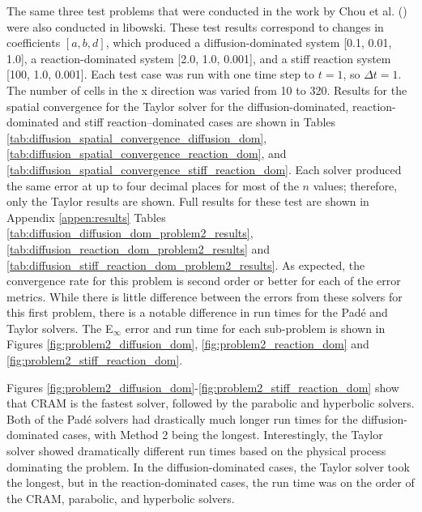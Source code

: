 The same three test problems that were conducted in the work by Chou et al. (\cite{ching2007}) were also conducted in libowski. These test results correspond to changes in coefficients $[a, b, d]$, which produced a diffusion-dominated system [0.1, 0.01, 1.0], a reaction-dominated system [2.0, 1.0, 0.001], and a stiff reaction system [100, 1.0, 0.001]. Each test case was run with one time step to $t = 1$, so $\Delta t = 1$. The number of cells in the x direction was varied from 10 to 320. Results for the spatial convergence for the Taylor solver for the diffusion-dominated, reaction-dominated and stiff reaction--dominated cases are shown in Tables \ref{tab:diffusion_spatial_convergence_diffusion_dom}, \ref{tab:diffusion_spatial_convergence_reaction_dom}, and \ref{tab:diffusion_spatial_convergence_stiff_reaction_dom}. Each solver produced the same error at up to four decimal places for most of the $n$ values; therefore, only the Taylor results are shown. Full results for these test are shown in Appendix \ref{appen:results} Tables \ref{tab:diffusion_diffusion_dom_problem2_results}, \ref{tab:diffusion_reaction_dom_problem2_results} and \ref{tab:diffusion_stiff_reaction_dom_problem2_results}. As expected, the convergence rate for this problem is second order or better for each of the error metrics.  While there is little difference between the errors from these solvers for this first problem, there is a notable difference in run times for the Pad\'e and Taylor solvers. The E${}_{\infty}$ error and run time for each sub-problem is shown in Figures \ref{fig:problem2_diffusion_dom}, \ref{fig:problem2_reaction_dom} and \ref{fig:problem2_stiff_reaction_dom}. 

Figures \ref{fig:problem2_diffusion_dom}-\ref{fig:problem2_stiff_reaction_dom} show that CRAM is the fastest solver, followed by the parabolic and hyperbolic solvers. Both of the Pad\'e solvers had drastically much longer run times for the diffusion-dominated cases, with Method 2 being the longest. Interestingly, the Taylor solver showed dramatically different run times based on the physical process dominating the problem. In the diffusion-dominated cases, the Taylor solver took the longest, but in the reaction-dominated cases, the run time was on the order of the CRAM, parabolic, and hyperbolic solvers. 

